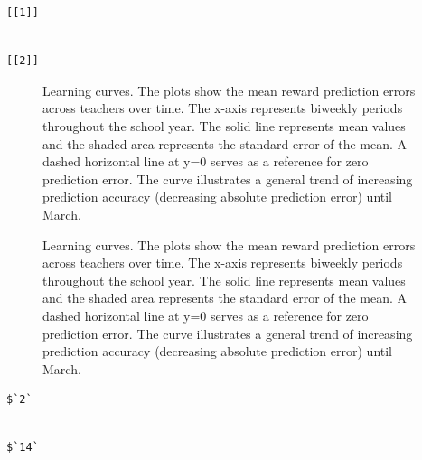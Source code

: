 \documentclass[
  number,
  preprint,
  3p,
  onecolumn]{elsarticle}
\begin{document}
\begin{verbatim}
[[1]]
\end{verbatim}

\begin{verbatim}

[[2]]
\end{verbatim}

\begin{figure}


\caption{\label{fig-prediction-errors-1}Learning curves. The plots show
the mean reward prediction errors across teachers over time. The x-axis
represents biweekly periods throughout the school year. The solid line
represents mean values and the shaded area represents the standard error
of the mean. A dashed horizontal line at y=0 serves as a reference for
zero prediction error. The curve illustrates a general trend of
increasing prediction accuracy (decreasing absolute prediction error)
until March.}

\end{figure}%

\begin{figure}


\caption{\label{fig-prediction-errors-2}Learning curves. The plots show
the mean reward prediction errors across teachers over time. The x-axis
represents biweekly periods throughout the school year. The solid line
represents mean values and the shaded area represents the standard error
of the mean. A dashed horizontal line at y=0 serves as a reference for
zero prediction error. The curve illustrates a general trend of
increasing prediction accuracy (decreasing absolute prediction error)
until March.}

\end{figure}%

\begin{verbatim}
$`2`
\end{verbatim}

\begin{verbatim}

$`14`
\end{verbatim}
\end{document}

